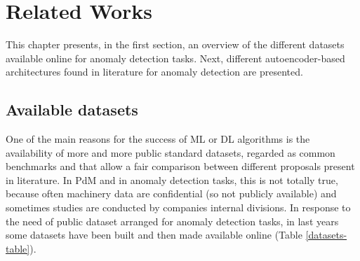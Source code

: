 \chapter{Related Works}
This chapter presents, in the first section, an overview of the different datasets available online for anomaly detection tasks. Next, different autoencoder-based architectures found in literature for anomaly detection are presented.

\section{Available datasets}
One of the main reasons for the success of ML or DL algorithms is the availability of more and more public standard datasets, regarded as common benchmarks and that allow a fair comparison between different proposals present in literature. In PdM and in anomaly detection tasks, this is not totally true, because often machinery data are confidential (so not publicly available) and sometimes studies are conducted by companies internal divisions. In response to the need of public dataset arranged for anomaly detection tasks, in last years some datasets have been built and then made available online (Table \ref{datasets-table}).\\


